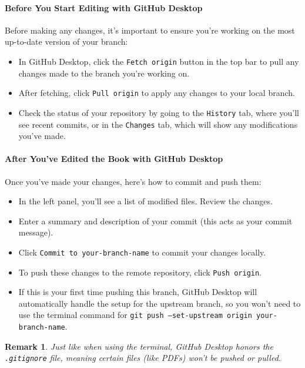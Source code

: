 \documentclass{article}
\newtheorem{remark}{Remark}
\begin{document}
    \paragraph{Before You Start Editing with GitHub Desktop}

    Before making any changes, it’s important to ensure you’re working on the most up-to-date version of your branch:

    \begin{itemize}
        \item In GitHub Desktop, click the \texttt{Fetch origin} button in the top bar to pull any changes made to the branch you're working on.
        \item After fetching, click \texttt{Pull origin} to apply any changes to your local branch.
        \item Check the status of your repository by going to the \texttt{History} tab, where you'll see recent commits, or in the \texttt{Changes} tab, which will show any modifications you've made.
    \end{itemize}

    \paragraph{After You've Edited the Book with GitHub Desktop}

    Once you’ve made your changes, here’s how to commit and push them:

    \begin{itemize}
        \item In the left panel, you’ll see a list of modified files.
              Review the changes.
        \item Enter a summary and description of your commit (this acts as your commit message).
        \item Click \texttt{Commit to your-branch-name} to commit your changes locally.
        \item To push these changes to the remote repository, click \texttt{Push origin}.
        \item If this is your first time pushing this branch, GitHub Desktop will automatically handle the setup for the upstream branch, so you won’t need to use the terminal command for \texttt{git push --set-upstream origin your-branch-name}.
    \end{itemize}

    \begin{remark}
        Just like when using the terminal, GitHub Desktop honors the \texttt{.gitignore} file, meaning certain files (like PDFs) won’t be pushed or pulled.
    \end{remark}
\end{document}
